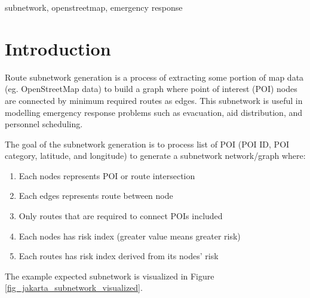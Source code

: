 \documentclass[conference]{IEEEtran}
\begin{document}
\begin{IEEEkeywords}
subnetwork, openstreetmap, emergency response
\end{IEEEkeywords}

\section{Introduction}

Route subnetwork generation is a process of extracting some portion of map data (eg. OpenStreetMap data) to build a graph where point of interest (POI) nodes are connected by minimum required routes as edges. This subnetwork is useful in modelling emergency response problems such as evacuation, aid distribution, and personnel scheduling.

The goal of the subnetwork generation is to process list of POI (POI ID, POI category, latitude, and longitude) to generate a subnetwork network/graph where:

\begin{enumerate}
\item Each nodes represents POI or route intersection
\item Each edges represents route between node
\item Only routes that are required to connect POIs included
\item Each nodes has risk index (greater value means greater risk)
\item Each routes has risk index derived from its nodes' risk
\end{enumerate} 

The example expected subnetwork is visualized in Figure \ref{fig_jakarta_subnetwork_visualized}.
\end{document}
